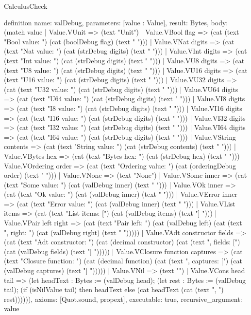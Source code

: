 \begin{lexlean}{CalculusCheck}
\begin{semanticmodule}
definition{
  name: valDebug,
  parameters: [value : Value],
  result: Bytes,
  body: (match value
    | Value.VUnit => (text "Unit")
    | Value.VBool flag => (cat (text "Bool { value: ") (cat (boolDebug flag) (text " }")))
    | Value.VNat digits => (cat (text "Nat { value: ") (cat (strDebug digits) (text " }")))
    | Value.VInt digits => (cat (text "Int { value: ") (cat (strDebug digits) (text " }")))
    | Value.VU8 digits => (cat (text "U8 { value: ") (cat (strDebug digits) (text " }")))
    | Value.VU16 digits => (cat (text "U16 { value: ") (cat (strDebug digits) (text " }")))
    | Value.VU32 digits => (cat (text "U32 { value: ") (cat (strDebug digits) (text " }")))
    | Value.VU64 digits => (cat (text "U64 { value: ") (cat (strDebug digits) (text " }")))
    | Value.VI8 digits => (cat (text "I8 { value: ") (cat (strDebug digits) (text " }")))
    | Value.VI16 digits => (cat (text "I16 { value: ") (cat (strDebug digits) (text " }")))
    | Value.VI32 digits => (cat (text "I32 { value: ") (cat (strDebug digits) (text " }")))
    | Value.VI64 digits => (cat (text "I64 { value: ") (cat (strDebug digits) (text " }")))
    | Value.VString contents => (cat (text "String { value: ") (cat (strDebug contents) (text " }")))
    | Value.VBytes hex => (cat (text "Bytes { hex: ") (cat (strDebug hex) (text " }")))
    | Value.VOrdering order => (cat (text "Ordering { value: ") (cat (orderingDebug order) (text " }")))
    | Value.VNone => (text "None")
    | Value.VSome inner => (cat (text "Some { value: ") (cat (valDebug inner) (text " }")))
    | Value.VOk inner => (cat (text "Ok { value: ") (cat (valDebug inner) (text " }")))
    | Value.VError inner => (cat (text "Error { value: ") (cat (valDebug inner) (text " }")))
    | Value.VList items => (cat (text "List { items: [") (cat (valDebug items) (text "] }")))
    | Value.VPair left right => (cat (text "Pair { left: ") (cat (valDebug left) (cat (text ", right: ") (cat (valDebug right) (text " }")))))
    | Value.VAdt constructor fields => (cat (text "Adt { constructor: ") (cat (decimal constructor) (cat (text ", fields: [") (cat (valDebug fields) (text "] }")))))
    | Value.VClosure function captures => (cat (text "Closure { function: ") (cat (decimal function) (cat (text ", captures: [") (cat (valDebug captures) (text "] }")))))
    | Value.VNil => (text "")
    | Value.VCons head tail => (let headText : Bytes := (valDebug head); (let rest : Bytes := (valDebug tail); (if (isNilValue tail) then headText else (cat headText (cat (text ", ") rest)))))),
  axioms: [Quot.sound, propext],
  executable: true,
  recursive_argument: value
}


\end{semanticmodule}
\end{lexlean}
